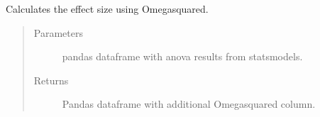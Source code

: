\documentclass[letterpaper,10pt,english]{sphinxmanual}
\begin{document}
\begin{fulllineitems}
\label{\detokenize{_autosummary/analytics_core.analytics:analytics_core.analytics.analytics.omega_squared}}
Calculates the effect size using Omega\sphinxhyphen{}squared.
\begin{quote}\begin{description}
\item[{Parameters}] \leavevmode
{} \textendash{} pandas dataframe with anova results from statsmodels.

\item[{Returns}] \leavevmode
Pandas dataframe with additional Omega\sphinxhyphen{}squared column.

\end{description}\end{quote}

\end{fulllineitems}

\end{document}
